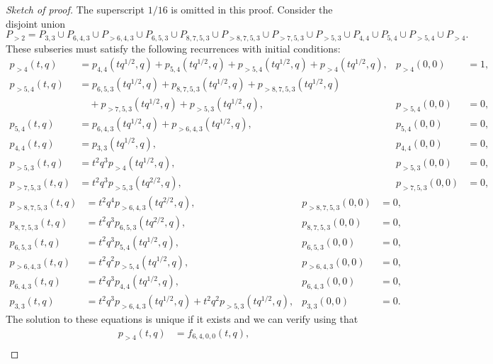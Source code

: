 \documentclass[a4paper, 12pt, reqno]{amsart}
\theoremstyle{remark}
\numberwithin{equation}{subsection}
\begin{document}
\begin{proof}[Sketch of proof]
  The superscript $1/16$ is omitted in this proof.
  Consider the disjoint union
  \begin{equation*}
    P_{>2} = P_{3, 3} \cup P_{6, 4, 3} \cup P_{>6, 4, 3} \cup P_{6, 5, 3} \cup P_{8, 7, 5, 3} \cup P_{>8, 7, 5, 3} \cup P_{>7, 5, 3} \cup P_{>5, 3} \cup P_{4, 4} \cup P_{5, 4} \cup P_{>5, 4} \cup P_{>4}.
  \end{equation*}
  These subseries must satisfy the following recurrences with initial conditions:
  \begin{align*}
    p_{>4}(t, q) &= p_{4, 4}(tq^{1/2}, q) + p_{5, 4}(tq^{1/2}, q) + p_{>5, 4}(tq^{1/2}, q) + p_{>4}(tq^{1/2}, q), &p_{>4}(0, 0) &= 1, \\
    p_{>5, 4}(t, q) &= p_{6, 5, 3}(tq^{1/2}, q) + p_{8, 7, 5, 3}(tq^{1/2}, q) + p_{>8, 7, 5, 3}(tq^{1/2}, q) \\
    &\quad + p_{>7, 5, 3}(tq^{1/2}, q) + p_{>5, 3}(tq^{1/2}, q), &p_{>5, 4}(0, 0) &= 0, \\
    p_{5, 4}(t, q) &= p_{6, 4, 3}(tq^{1/2}, q) + p_{>6, 4, 3}(tq^{1/2}, q), &p_{5, 4}(0, 0) &= 0, \\
    p_{4, 4}(t, q) &= p_{3, 3}(tq^{1/2}, q), &p_{4, 4}(0, 0) &= 0, \\
    p_{>5, 3}(t, q) &= t^2q^3p_{>4}(tq^{1/2}, q), &p_{>5, 3}(0, 0) &= 0, \\
    p_{>7, 5, 3}(t, q) &= t^2q^3p_{>5, 3}(tq^{2/2}, q), &p_{>7, 5, 3}(0, 0) &= 0,
  \end{align*}
  \begin{align*}
    p_{>8, 7, 5, 3}(t, q) &= t^2q^4p_{>6, 4, 3}(tq^{2/2}, q), &p_{>8, 7, 5, 3}(0, 0) &= 0, \\
    p_{8, 7, 5, 3}(t, q) &= t^2q^3p_{6, 5, 3}(tq^{2/2}, q), &p_{8, 7, 5, 3}(0, 0) &= 0, \\
    p_{6, 5, 3}(t, q) &= t^2q^3p_{5, 4}(tq^{1/2}, q), &p_{6, 5, 3}(0, 0) &= 0, \\
    p_{>6, 4, 3}(t, q) &= t^2q^2p_{>5, 4}(tq^{1/2}, q), &p_{>6, 4, 3}(0, 0) &= 0, \\
    p_{6, 4, 3}(t, q) &= t^2q^3p_{4, 4}(tq^{1/2}, q), &p_{6, 4, 3}(0, 0) &= 0, \\
    p_{3, 3}(t, q) &= t^2q^3p_{>6, 4, 3}(tq^{1/2}, q) + t^2q^2p_{>5, 3}(tq^{1/2}, q), &p_{3, 3}(0, 0) &= 0.
  \end{align*}
  The solution to these equations is unique if it exists and we can verify using  that
  \begin{align*}
    p_{>4}(t, q) &= f_{6, 4, 0, 0}(t, q), \\

\end{align*}
\end{proof}
\end{document}
